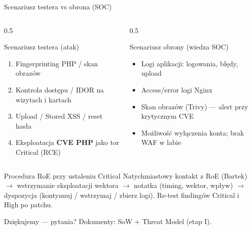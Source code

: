 \documentclass[aspectratio=169,11pt]{beamer}
\begin{document}
\begin{frame}{Scenariusz testera vs obrona (SOC)}
  \begin{columns}[T]
    \begin{column}{0.5\textwidth}
      \begin{block}{Scenariusz testera (atak)}
        \footnotesize
        \begin{enumerate}
          \item Fingerprinting PHP / skan obrazów
          \item Kontrola dostępu / IDOR na wizytach i kartach
          \item Upload / Stored XSS / reset hasła
          \item Eksploatacja \textbf{CVE PHP} jako tor Critical (RCE)
        \end{enumerate}
      \end{block}
    \end{column}
    \begin{column}{0.5\textwidth}
      \begin{block}{Scenariusz obrony (wiedza SOC)}
        \footnotesize
        \begin{itemize}
          \item Logi aplikacji: logowania, błędy, upload
          \item Access/error logi Nginx
          \item Skan obrazów (Trivy) — alert przy krytycznym CVE
          \item Możliwość wyłączenia konta; brak WAF w labie
        \end{itemize}
      \end{block}
    \end{column}
  \end{columns}

  \begin{block}{Procedura RoE przy ustaleniu Critical}
    \footnotesize
    Natychmiastowy kontakt z RoE (Bartek) $\rightarrow$ wstrzymanie eksploatacji wektora $\rightarrow$ notatka (timing, wektor, wpływ) $\rightarrow$ dyspozycja (kontynuuj / wstrzymaj / zbierz logi). Re-test findingów Critical i High po patchu.
  \end{block}

  \centering\footnotesize Dziękujemy — pytania? \quad\textbullet\quad Dokumenty: SoW + Threat Model (etap I).
\end{frame}
\end{document}
